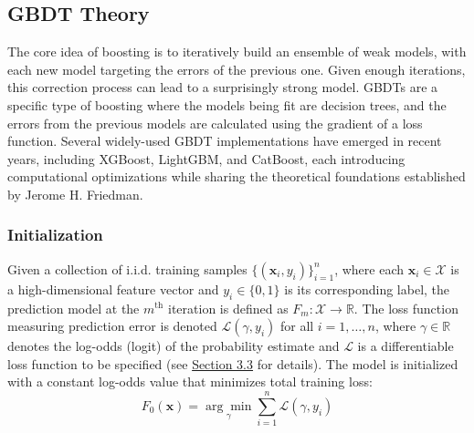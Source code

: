 \documentclass{article}
\begin{document}
\subsection{GBDT Theory}
The core idea of boosting is to iteratively build an ensemble of weak models, with each new model targeting the errors of the previous one. Given enough iterations, this correction process can lead to a surprisingly strong model. GBDTs are a specific type of boosting where the models being fit are decision trees, and the errors from the previous models are calculated using the gradient of a loss function. Several widely-used GBDT implementations have emerged in recent years, including XGBoost\cite{XGBoost}, LightGBM\cite{LightGBM}, and CatBoost\cite{CatBoost}, each introducing computational optimizations while sharing the theoretical foundations established by Jerome H. Friedman.\cite{Friedman_GBM, Friedman_StochasticGBM}

\subsubsection*{Initialization}
Given a collection of i.i.d. training samples $\{(\mathbf{x}_i, y_i)\}_{i=1}^n$, where each $\mathbf{x}_i \in \mathcal{X}$ is a high-dimensional feature vector and $y_i \in \{0,1\}$ is its corresponding label, the prediction model at the $m^{\text{th}}$ iteration is defined as $F_m: \mathcal{X} \to \mathbb{R}$. The loss function measuring prediction error is denoted $\mathcal{L}(\gamma, y_i)$ for all $i=1,\dots,n$, where $\gamma \in \mathbb{R}$ denotes the log-odds (logit) of the probability estimate and $\mathcal{L}$ is a differentiable loss function to be specified (see \hyperref[subsec:loss]{Section 3.3} for details). The model is initialized with a constant log-odds value that minimizes total training loss:
\begin{equation}
    F_0(\mathbf{x}) = \underset{\gamma}{\arg\!\min} \sum_{i=1}^{n} \mathcal{L}(\gamma, y_i)
\end{equation}
\end{document}
